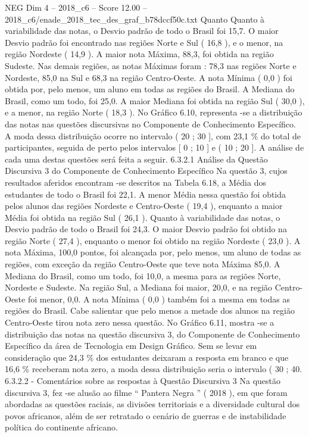 \begin{textsample}{NEG Dim 4 – 2018\_c6 – Score 12.00 – 2018\_c6/enade\_2018\_tec\_des\_graf\_b78dccf50c.txt}
Quanto Quanto à variabilidade das notas, o Desvio padrão de todo o Brasil foi 15,7.
O maior Desvio padrão foi encontrado nas regiões Norte e Sul ( 16,8 ), e o menor, na região Nordeste ( 14,9 ).
A maior nota Máxima, 88,3, foi obtida na região Sudeste.
Nas demais regiões, as notas Máximas foram : 78,3 nas regiões Norte e Nordeste, 85,0 na Sul e 68,3 na região Centro-Oeste.
A nota Mínima ( 0,0 ) foi obtida por, pelo menos, um aluno em todas as regiões do Brasil.
A Mediana do Brasil, como um todo, foi 25,0.
A maior Mediana foi obtida na região Sul ( 30,0 ), e a menor, na região Norte ( 18,3 ).
No Gráfico 6.10, representa -se a distribuição das notas nas questões discursivas no Componente de Conhecimento Específico.
A moda dessa distribuição ocorre no intervalo ( 20 ; 30 ], com 23,1 \% do total de participantes, seguida de perto pelos intervalos [ 0 ; 10 ] e ( 10 ; 20 ].
A análise de cada uma destas questões será feita a seguir. 6.3.2.1 Análise da Questão Discursiva 3 do Componente de Conhecimento Específico Na questão 3, cujos resultados aferidos encontram -se descritos na Tabela 6.18, a Média dos estudantes de todo o Brasil foi 22,1.
A menor Média nessa questão foi obtida pelos alunos das regiões Nordeste e Centro-Oeste ( 19,4 ), enquanto a maior Média foi obtida na região Sul ( 26,1 ).
Quanto à variabilidade das notas, o Desvio padrão de todo o Brasil foi 24,3.
O maior Desvio padrão foi obtido na região Norte ( 27,4 ), enquanto o menor foi obtido na região Nordeste ( 23,0 ).
A nota Máxima, 100,0 pontos, foi alcançada por, pelo menos, um aluno de todas as regiões, com exceção da região Centro-Oeste que teve nota Máxima 85,0.
A Mediana do Brasil, como um todo, foi 10,0, a mesma para as regiões Norte, Nordeste e Sudeste.
Na região Sul, a Mediana foi maior, 20,0, e na região Centro-Oeste foi menor, 0,0.
A nota Mínima ( 0,0 ) também foi a mesma em todas as regiões do Brasil.
Cabe salientar que pelo menos a metade dos alunos na região Centro-Oeste tirou nota zero nessa questão.
No Gráfico 6.11, mostra -se a distribuição das notas na questão discursiva 3, do Componente de Conhecimento Específico da área de Tecnologia em Design Gráfico.
Sem se levar em consideração que 24,3 \% dos estudantes deixaram a resposta em branco e que 16,6 \% receberam nota zero, a moda dessa distribuição seria o intervalo ( 30 ; 40. 6.3.2.2 - Comentários sobre as respostas à Questão Discursiva 3 Na questão discursiva 3, fez -se alusão ao filme “ Pantera Negra ” ( 2018 ), em que foram abordadas as questões raciais, as divisões territoriais e a diversidade cultural dos povos africanos, além de ser retratado o cenário de guerras e de instabilidade política do continente africano.

\end{textsample}
